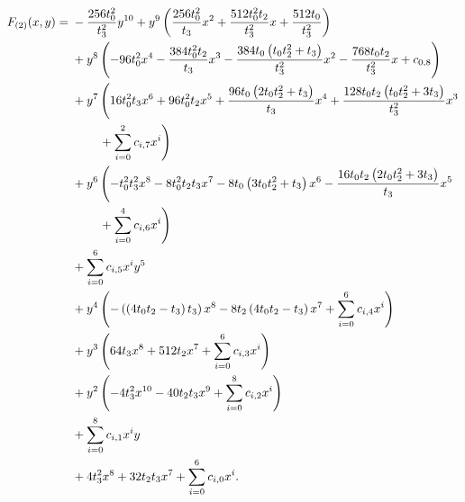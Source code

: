 \begin{align}
    \label{curve:ising_free}
    F_{(2)}(x,y)={} & -\frac{256 t_0^2}{t_3^2}y^{10}{}+y^{9}\left(\frac{256 t_0^2}{t_3}x^{2} + \frac{512 t_0^2 t_2}{t_3^2}x + \frac{512 t_0}{t_3^2}\right)\notag \\
                    & {}+y^{8}\left(-96 t_0^2x^{4} - \frac{384 t_0^2 t_2}{t_3}x^{3} - \frac{384 t_0 \left(t_0 t_2^2+t_3\right)}{t_3^2}x^{2} - \frac{768 t_0 t_2}{t_3^2}x + c_{0,8}\right)\notag \\
                    & {}+y^{7}\left(16 t_0^2 t_3x^{6} + 96 t_0^2 t_2x^{5} + \frac{96 t_0 \left(2 t_0 t_2^2+t_3\right)}{t_3}x^{4} + \frac{128 t_0 t_2 \left(t_0 t_2^2+3 t_3\right)}{t_3^2}x^{3}\right.\notag \\*
                    & \qquad{}\left.{}+ \sum_{i=0}^{2}c_{i,7}x^i\right)\notag \\
                    & {}+y^{6}\left(-t_0^2 t_3^2x^{8} - 8 t_0^2 t_2 t_3x^{7} - 8 t_0 \left(3 t_0 t_2^2+t_3\right)x^{6} - \frac{16 t_0 t_2 \left(2 t_0 t_2^2+3 t_3\right)}{t_3}x^{5}\right.\notag \\*
                    & \qquad{}\left.{}+ \sum_{i=0}^{4}c_{i,6}x^i\right)\notag \\
                    & {}+\sum_{i=0}^{6}c_{i,5}x^iy^{5}\notag \\
                    & {}+y^{4}\left(-\left(\left(4 t_0 t_2-t_3\right) t_3\right)x^{8} - 8 t_2 \left(4 t_0 t_2-t_3\right)x^{7} + \sum_{i=0}^{6}c_{i,4}x^i\right)\notag \\
                    & {}+y^{3}\left(64 t_3x^{8} + 512 t_2x^{7} + \sum_{i=0}^{6}c_{i,3}x^i\right)\notag \\
                    & {}+y^{2}\left(-4 t_3^2x^{10} - 40 t_2 t_3x^{9} + \sum_{i=0}^{8}c_{i,2}x^i\right)\notag \\
                    & {}+\sum_{i=0}^{8}c_{i,1}x^iy\notag \\
                    & {}+4 t_3^2x^{8} + 32 t_2 t_3x^{7} + \sum_{i=0}^{6}c_{i,0}x^i.
\end{align}
